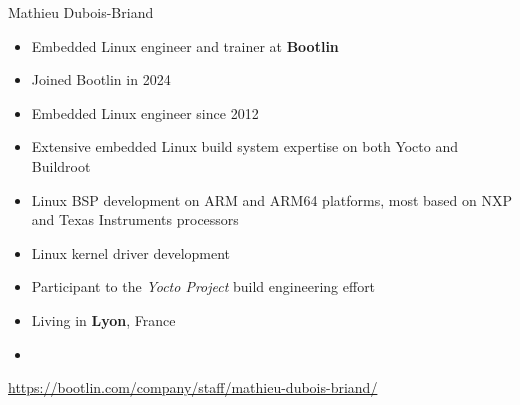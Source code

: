 \begin{frame}{Mathieu Dubois-Briand}
  \begin{itemize}
  \item Embedded Linux engineer and trainer at {\bf Bootlin}
  \item Joined Bootlin in 2024
  \item Embedded Linux engineer since 2012
  \item Extensive embedded Linux build system expertise on both Yocto
    and Buildroot
  \item Linux BSP development on ARM and ARM64 platforms, most based
    on NXP and Texas Instruments processors
  \item Linux kernel driver development
  \item Participant to the {\em Yocto Project} build engineering effort
  \item Living in {\bf Lyon}, France
  \item {}
  \end{itemize}
  {\small \url{https://bootlin.com/company/staff/mathieu-dubois-briand/}}
\end{frame}
